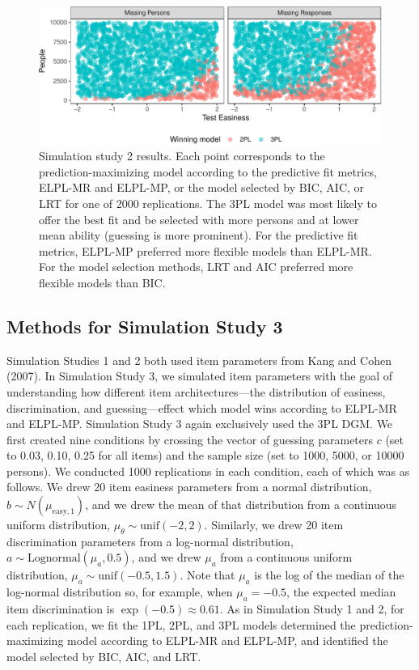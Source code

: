 \documentclass[
  english,
  man,floatsintext]{apa7}
\begin{document}
\begin{figure}

{\centering \includegraphics[width=2100px]{irt-predictive-fit-apa_files/figure-latex/results4b-1} 

}

\caption{Simulation study 2 results. Each point corresponds to the prediction-maximizing model according to the predictive fit metrics, ELPL-MR and ELPL-MP, or the model selected by BIC, AIC, or LRT for one of 2000 replications. The 3PL model was most likely to offer the best fit and be selected with more persons and at lower mean ability (guessing is more prominent). For the predictive fit metrics, ELPL-MP preferred more flexible models than ELPL-MR. For the model selection methods, LRT and AIC preferred more flexible models than BIC.}\label{fig:results4b}
\end{figure}

\hypertarget{methods-for-simulation-study-3}{%
\subsection{Methods for Simulation Study 3}\label{methods-for-simulation-study-3}}

Simulation Studies 1 and 2 both used item parameters from Kang and Cohen (2007). In Simulation Study 3, we simulated item parameters with the goal of understanding how different item architectures---the distribution of easiness, discrimination, and guessing---effect which model wins according to ELPL-MR and ELPL-MP. Simulation Study 3 again exclusively used the 3PL DGM. We first created nine conditions by crossing the vector of guessing parameters \(c\) (set to 0.03, 0.10, 0.25 for all items) and the sample size (set to 1000, 5000, or 10000 persons). We conducted 1000 replications in each condition, each of which was as follows. We drew 20 item easiness parameters from a normal distribution, \(b \sim N(\mu_{\text{easy}, 1})\), and we drew the mean of that distribution from a continuous uniform distribution, \(\mu_{\theta} \sim \text{unif}(-2, 2)\). Similarly, we drew 20 item discrimination parameters from a log-normal distribution, \(a \sim \text{Lognormal}(\mu_{a}, 0.5)\), and we drew \(\mu_{a}\) from a continuous uniform distribution, \(\mu_{a} \sim \text{unif}(-0.5, 1.5)\). Note that \(\mu_{a}\) is the log of the median of the log-normal distribution so, for example, when \(\mu_{a} = -0.5\), the expected median item discrimination is \(\exp(-0.5) \approx 0.61\). As in Simulation Study 1 and 2, for each replication, we fit the 1PL, 2PL, and 3PL models determined the prediction-maximizing model according to ELPL-MR and ELPL-MP, and identified the model selected by BIC, AIC, and LRT.
\end{document}
